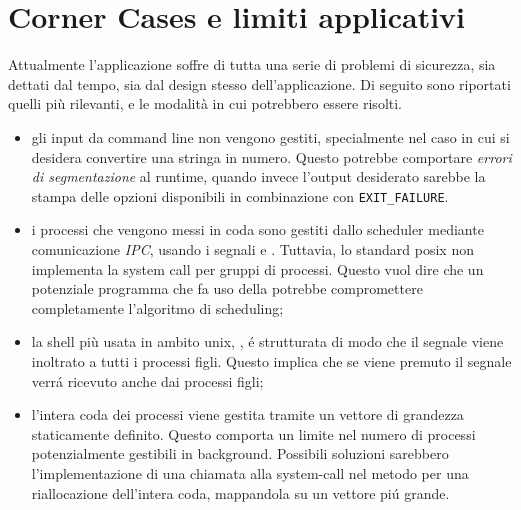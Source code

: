 \documentclass[11pt]{article}
\begin{document}
\\
\\
\\
\\
\\
\\
\\
\\
\\
\\
\\
\\

\section{Corner Cases e limiti applicativi}

Attualmente l'applicazione soffre di tutta una serie di problemi di sicurezza,
sia dettati dal tempo, sia dal design stesso dell'applicazione. Di seguito sono
riportati quelli pi\`u rilevanti, e le modalit\`a in cui potrebbero essere
risolti.

\begin{itemize}
\item gli input da command line non vengono gestiti, specialmente nel caso in cui si desidera convertire una stringa in numero.
      Questo potrebbe comportare \emph{errori di segmentazione} al runtime, quando invece l'output desiderato sarebbe la stampa
      delle opzioni disponibili  in combinazione con \texttt{EXIT\_FAILURE}.

\item i processi che vengono messi in coda sono gestiti dallo scheduler mediante
      comunicazione \emph{IPC}, usando i segnali
       e . Tuttavia, lo standard posix non
      implementa la system call  per gruppi di processi. Questo vuol
      dire che un potenziale programma che fa uso della  potrebbe
      compromettere completamente l'algoritmo di scheduling;

\item la shell pi\`u usata in ambito unix, , \'e strutturata di modo
      che il segnale  viene inoltrato a tutti i processi figli.
      Questo implica che se viene premuto  il segnale verr\'a ricevuto
      anche dai processi figli;

\item l'intera coda dei processi viene gestita tramite un vettore di grandezza 
      staticamente definito. Questo comporta un limite nel numero di processi potenzialmente
      gestibili in background. Possibili soluzioni sarebbero l'implementazione di una chiamata alla
      system-call  nel metodo  per una riallocazione
      dell'intera coda, mappandola su un vettore pi\'u grande.
\end{itemize}
\end{document}
